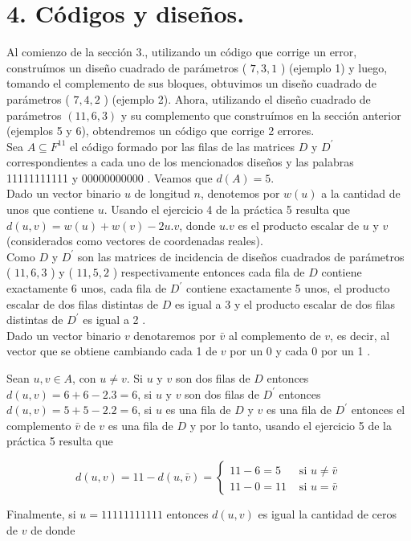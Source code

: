 \documentclass[10pt]{article}
\begin{document}
\section*{4. Códigos y diseños.}
Al comienzo de la sección 3., utilizando un código que corrige un error, construímos un diseño cuadrado de parámetros ( $7,3,1$ ) (ejemplo 1) y luego, tomando el complemento de sus bloques, obtuvimos un diseño cuadrado de parámetros ( $7,4,2$ ) (ejemplo 2). Ahora, utilizando el diseño cuadrado de parámetros $(11,6,3)$ y su complemento que construímos en la sección anterior (ejemplos 5 y 6), obtendremos un código que corrige 2 errores.\\
Sea $A \subseteq F^{11}$ el código formado por las filas de las matrices $D$ y $D^{\prime}$ correspondientes a cada uno de los mencionados diseños y las palabras 11111111111 y 00000000000 . Veamos que $d(A)=5$.\\
Dado un vector binario $u$ de longitud $n$, denotemos por $w(u)$ a la cantidad de unos que contiene $u$. Usando el ejercicio 4 de la práctica 5 resulta que $d(u, v)=w(u)+w(v)-2 u . v$, donde $u . v$ es el producto escalar de $u$ y $v$ (considerados como vectores de coordenadas reales).\\
Como $D$ y $D^{\prime}$ son las matrices de incidencia de diseños cuadrados de parámetros ( $11,6,3$ ) y ( $11,5,2$ ) respectivamente entonces cada fila de $D$ contiene exactamente 6 unos, cada fila de $D^{\prime}$ contiene exactamente 5 unos, el producto escalar de dos filas distintas de $D$ es igual a 3 y el producto escalar de dos filas distintas de $D^{\prime}$ es igual a 2 .\\
Dado un vector binario $v$ denotaremos por $\bar{v}$ al complemento de $v$, es decir, al vector que se obtiene cambiando cada 1 de $v$ por un 0 y cada 0 por un 1 .

Sean $u, v \in A$, con $u \neq v$. Si $u$ y $v$ son dos filas de $D$ entonces $d(u, v)=6+6-2.3=6$, si $u$ y $v$ son dos filas de $D^{\prime}$ entonces $d(u, v)=5+5-2.2=6$, si $u$ es una fila de $D$ y $v$ es una fila de $D^{\prime}$ entonces el complemento $\bar{v}$ de $v$ es una fila de $D$ y por lo tanto, usando el ejercicio 5 de la práctica 5 resulta que

$$
d(u, v)=11-d(u, \bar{v})= \begin{cases}11-6=5 & \text { si } u \neq \bar{v} \\ 11-0=11 & \text { si } u=\bar{v}\end{cases}
$$

Finalmente, si $u=11111111111$ entonces $d(u, v)$ es igual la cantidad de ceros de $v$ de donde
\end{document}
